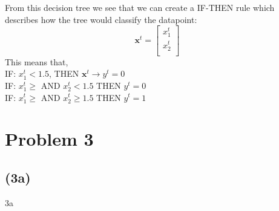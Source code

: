 \documentclass[12pt, letterpaper]{article}
\newcommand{\mbf}{\mathbf}
\begin{document}
      \noindent From this decision tree we see that we can create a IF-THEN rule which describes how the tree would classify the datapoint:
      \[
        \mbf{x}^t =
        \left[
          \begin{array}{ccc}
            x_1^t \\
            x_2^t \\
          \end{array}
        \right]
      \]
      This means that, \\
      IF: $x_1^t < 1.5$, THEN $\mbf{x}^t \rightarrow y^t = 0$\\
      IF: $x_1^t \geq$ AND $x_2^t < 1.5$ THEN $y^t = 0$\\
      IF: $x_1^t \geq$ AND $x_2^t \geq 1.5$ THEN $y^t = 1$
  \section*{Problem 3}
    \subsection*{(3a)}
      3a
\end{document}
